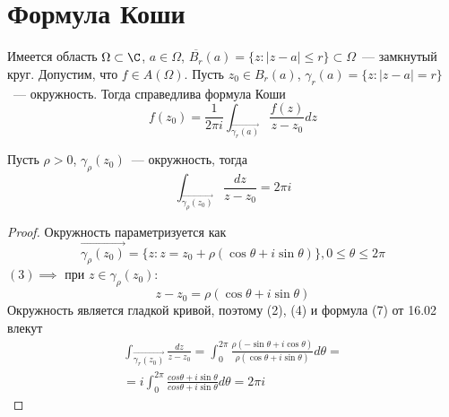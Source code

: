 \documentclass[main]{subfiles}
\begin{document}
\chapter{Формула Коши}

\begin{theorem}
    Имеется область $\Omega \subset \C$, $a \in \Omega$, $\overline{B_r}(a) = \{z: |z-a| \le r\} \subset \Omega$~--- замкнутый круг.
    Допустим, что $f \in A(\Omega)$.
    Пусть $z_0 \in B_r(a)$, $\gamma_r(a) = \{z: |z-a| = r\}$~--- окружность.
    Тогда справедлива формула Коши
    \[f(z_0) = \frac{1}{2 \pi i} \int_{\overrightarrow{\gamma_r(a)}} \frac{f(z)}{z - z_0} dz \tag{1}\]
\end{theorem}

\begin{lemma}
    Пусть $\rho > 0$, $\gamma_\rho(z_0)$~--- окружность, тогда
    \[\int_{\overrightarrow{\gamma_\rho(z_0)}} \frac{dz}{z - z_0} = 2 \pi i \tag{2} \]
\end{lemma}

\begin{proof}
    Окружность параметризуется как
    \[\overrightarrow{\gamma_\rho(z_0) } = \{z: z = z_0 +\rho(\cos \theta + i \sin \theta)\}, 0 \le \theta \le 2 \pi \tag{3}\]
    $(3) \implies$ при $z \in \gamma_\rho(z_0)$:
    \[z - z_0 = \rho(\cos \theta + i \sin \theta) \tag{4}\]
    Окружность является гладкой кривой, поэтому (2), (4) и формула (7) от 16.02 влекут
    \begin{multline*}
        \int_{\overrightarrow{\gamma_r(z_0)}} \frac{dz}{z - z_0} = \int_{0}^{2\pi} \frac{\rho(-\sin\theta + i \cos \theta)}{\rho(\cos \theta + i \sin \theta)} d\theta =\\
        = i \int_{0}^{2 \pi} \frac{cos \theta + i \sin \theta}{cos \theta + i \sin \theta} d\theta = 2 \pi i
    \end{multline*}
\end{proof}
\end{document}
